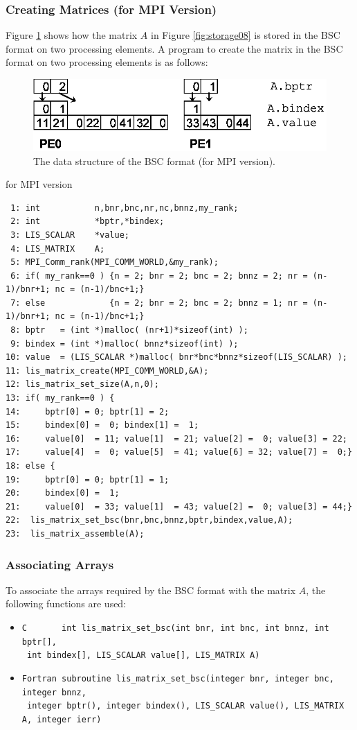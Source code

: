 \documentclass[a4paper]{article}
\begin{document}
\subsubsection{Creating Matrices (for MPI Version)}
Figure \ref{fig:storage08_mpi} shows how the matrix $A$ in Figure
\ref{fig:storage08} is stored in the BSC format on two processing
elements. A program to create the matrix in the BSC format on two processing elements is as follows:
\begin{figure}[h]
{\centering 
\includegraphics{storage08_mpi.eps} 
\caption{The data structure of the BSC format (for MPI version).}\label{fig:storage08_mpi}}
\end{figure}
\begin{itembox}[l]{for MPI version}
\small
\begin{verbatim}
 1: int           n,bnr,bnc,nr,nc,bnnz,my_rank;
 2: int           *bptr,*bindex;
 3: LIS_SCALAR    *value;
 4: LIS_MATRIX    A;
 5: MPI_Comm_rank(MPI_COMM_WORLD,&my_rank);
 6: if( my_rank==0 ) {n = 2; bnr = 2; bnc = 2; bnnz = 2; nr = (n-1)/bnr+1; nc = (n-1)/bnc+1;}
 7: else             {n = 2; bnr = 2; bnc = 2; bnnz = 1; nr = (n-1)/bnr+1; nc = (n-1)/bnc+1;}
 8: bptr   = (int *)malloc( (nr+1)*sizeof(int) );
 9: bindex = (int *)malloc( bnnz*sizeof(int) );
10: value  = (LIS_SCALAR *)malloc( bnr*bnc*bnnz*sizeof(LIS_SCALAR) );
11: lis_matrix_create(MPI_COMM_WORLD,&A);
12: lis_matrix_set_size(A,n,0);
13: if( my_rank==0 ) {
14:     bptr[0] = 0; bptr[1] = 2;
15:     bindex[0] =  0; bindex[1] =  1;
16:     value[0]  = 11; value[1]  = 21; value[2] =  0; value[3] = 22;
17:     value[4]  =  0; value[5]  = 41; value[6] = 32; value[7] =  0;}
18: else {
19:     bptr[0] = 0; bptr[1] = 1;
20:     bindex[0] =  1;
21:     value[0]  = 33; value[1]  = 43; value[2] =  0; value[3] = 44;}
22:  lis_matrix_set_bsc(bnr,bnc,bnnz,bptr,bindex,value,A);
23:  lis_matrix_assemble(A);
\end{verbatim}
\end{itembox}
\subsubsection{Associating Arrays}
To associate the arrays required by the BSC format with the matrix $A$, the following functions are used:
\begin{itemize}
\item \verb|C       int lis_matrix_set_bsc(int bnr, int bnc, int bnnz, int bptr[],|\\
      \verb| int bindex[], LIS_SCALAR value[], LIS_MATRIX A)|
\item \verb|Fortran subroutine lis_matrix_set_bsc(integer bnr, integer bnc, integer bnnz,|\\
      \verb| integer bptr(), integer bindex(), LIS_SCALAR value(), LIS_MATRIX A, integer ierr)|
\end{itemize}
\end{document}
